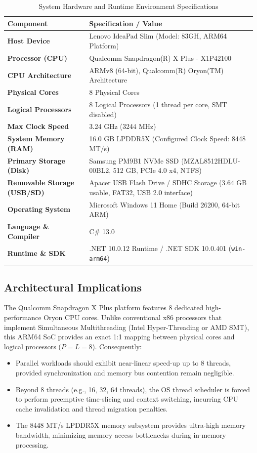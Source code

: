 \documentclass[12pt,a4paper]{article}
\begin{document}
\begin{table}[htbp]
\centering
\caption{System Hardware and Runtime Environment Specifications}
\label{tab:hardware_specs}
\small
\begin{tabularx}{\textwidth}{lX}
\toprule
\textbf{Component} & \textbf{Specification / Value} \\
\midrule
\textbf{Host Device} & Lenovo IdeaPad Slim (Model: 83GH, ARM64 Platform) \\
\textbf{Processor (CPU)} & Qualcomm Snapdragon(R) X Plus - X1P42100 \\
\textbf{CPU Architecture} & ARMv8 (64-bit), Qualcomm(R) Oryon(TM) Architecture \\
\textbf{Physical Cores} & 8 Physical Cores \\
\textbf{Logical Processors} & 8 Logical Processors (1 thread per core, SMT disabled) \\
\textbf{Max Clock Speed} & 3.24 GHz (3244 MHz) \\
\textbf{System Memory (RAM)} & 16.0 GB LPDDR5X (Configured Clock Speed: 8448 MT/s) \\
\textbf{Primary Storage (Disk)} & Samsung PM9B1 NVMe SSD (MZAL8512HDLU-00BL2, 512 GB, PCIe 4.0 x4, NTFS) \\
\textbf{Removable Storage (USB/SD)} & Apacer USB Flash Drive / SDHC Storage (3.64 GB usable, FAT32, USB 2.0 interface) \\
\textbf{Operating System} & Microsoft Windows 11 Home (Build 26200, 64-bit ARM) \\
\textbf{Language \& Compiler} & C\# 13.0 \\
\textbf{Runtime \& SDK} & .NET 10.0.12 Runtime / .NET SDK 10.0.401 (\texttt{win-arm64}) \\
\bottomrule
\end{tabularx}
\end{table}

\subsection{Architectural Implications}
The Qualcomm Snapdragon X Plus platform features 8 dedicated high-performance Oryon CPU cores. Unlike conventional x86 processors that implement Simultaneous Multithreading (Intel Hyper-Threading or AMD SMT), this ARM64 SoC provides an exact 1:1 mapping between physical cores and logical processors ($P = L = 8$). Consequently:
\begin{itemize}
    \item Parallel workloads should exhibit near-linear speed-up up to 8 threads, provided synchronization and memory bus contention remain negligible.
    \item Beyond 8 threads (e.g., 16, 32, 64 threads), the OS thread scheduler is forced to perform preemptive time-slicing and context switching, incurring CPU cache invalidation and thread migration penalties.
    \item The 8448 MT/s LPDDR5X memory subsystem provides ultra-high memory bandwidth, minimizing memory access bottlenecks during in-memory processing.
\end{itemize}
\end{document}
